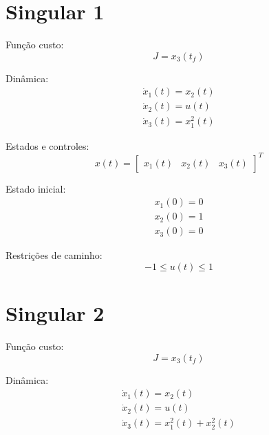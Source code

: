 \documentclass[10pt,a4paper]{article}
\begin{document}
	
	
	\section{Singular 1}
	
	Função custo:
	\begin{equation}
		J = x_3(t_f)
	\end{equation}
	
	Dinâmica: 
	\begin{equation}
		\begin{gathered}
			\dot{x}_1(t) = x_2(t) \\
			\dot{x}_2(t) = u(t) \\
			\dot{x}_3(t) = x_1^2(t)
		\end{gathered}
	\end{equation}

	Estados e controles:
	\begin{equation}
		x(t) = \begin{bmatrix} x_1(t) & x_2(t) & x_3(t) \end{bmatrix}^T
	\end{equation}

	Estado inicial:
	\begin{equation}
		\begin{gathered}
			x_1(0) = 0 \\
			x_2(0) = 1 \\
			x_3(0) = 0 
		\end{gathered}
	\end{equation}

	Restrições de caminho:
	\begin{equation}
		-1 \leq u(t) \leq 1
	\end{equation}

	
	\section{Singular 2}
	
	Função custo:
	\begin{equation}
		J = x_3(t_f)
	\end{equation}
	
	Dinâmica: 
	\begin{equation}
		\begin{gathered}
			\dot{x}_1(t) = x_2(t) \\
			\dot{x}_2(t) = u(t) \\
			\dot{x}_3(t) = x_1^2(t) + x_2^2(t)
		\end{gathered}
	\end{equation}
\end{document}
